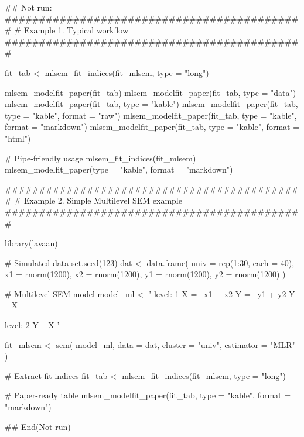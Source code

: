 \documentclass[a4paper]{book}
\begin{document}
\begin{Examples}
\begin{ExampleCode}
\#\# Not run: 
############################################
# Example 1. Typical workflow
############################################

fit_tab <- mlsem_fit_indices(fit_mlsem, type = "long")

mlsem_modelfit_paper(fit_tab)
mlsem_modelfit_paper(fit_tab, type = "data")
mlsem_modelfit_paper(fit_tab, type = "kable")
mlsem_modelfit_paper(fit_tab, type = "kable", format = "raw")
mlsem_modelfit_paper(fit_tab, type = "kable", format = "markdown")
mlsem_modelfit_paper(fit_tab, type = "kable", format = "html")

# Pipe-friendly usage
mlsem_fit_indices(fit_mlsem) %
  mlsem_modelfit_paper(type = "kable", format = "markdown")


############################################
# Example 2. Simple Multilevel SEM example
############################################

library(lavaan)

# Simulated data
set.seed(123)
dat <- data.frame(
  univ = rep(1:30, each = 40),
  x1 = rnorm(1200),
  x2 = rnorm(1200),
  y1 = rnorm(1200),
  y2 = rnorm(1200)
)

# Multilevel SEM model
model_ml <- '
  level: 1
    X =~ x1 + x2
    Y =~ y1 + y2
    Y ~ X

  level: 2
    Y ~ X
'

fit_mlsem <- sem(
  model_ml,
  data    = dat,
  cluster = "univ",
  estimator = "MLR"
)

# Extract fit indices
fit_tab <- mlsem_fit_indices(fit_mlsem, type = "long")

# Paper-ready table
mlsem_modelfit_paper(fit_tab, type = "kable", format = "markdown")

## End(Not run)
\end{ExampleCode}
\end{Examples}
\end{document}
